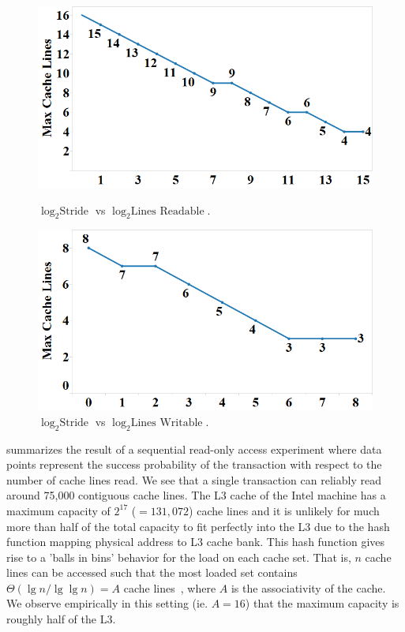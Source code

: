 \begin{figure}[h]
\centering
\begin{minipage}[b]{.45\linewidth}
\centering
\includegraphics[width=\linewidth]{images/wttm_stride_read_intel}
\caption{$\log_2{\textrm{Stride}}$ vs $\log_2{\textrm{Lines Readable}}$.}
\label{fig:wttm_stride_read_intel}
\end{minipage}%
\quad
\begin{minipage}[b]{.45\linewidth}
\centering
\includegraphics[width=\linewidth]{images/wttm_stride_write_intel}
\caption{$\log_2{\textrm{Stride}}$ vs $\log_2{\textrm{Lines Writable}}$.}
\label{fig:wttm_stride_write_intel}
\end{minipage}
\end{figure}

 summarizes the result of a sequential
read-only access experiment where data points represent the success
probability of the transaction with respect to the 
number of cache lines read.  We see that a 
single transaction can reliably read 
around 75,000 contiguous cache lines. 
The {L3} cache of the Intel machine has a maximum
capacity of $2^{17}$ ($=131,072$) cache lines and it is unlikely
for much more than half of the total capacity to 
fit perfectly into the {L3} due to
the hash function mapping physical address to L3 cache bank.
This hash function gives rise to a
'balls in bins' behavior for the load on each cache set.  That is, 
$n$ cache lines can be accessed such that
the most loaded set contains $\Theta(\lg n / \lg \lg n) = A$ 
cache lines~\cite{Gonnet81}, where $A$ is the associativity of the cache. 
We observe empirically in this setting (ie. $A=16$) that
the maximum capacity is roughly half of the {L3}.

